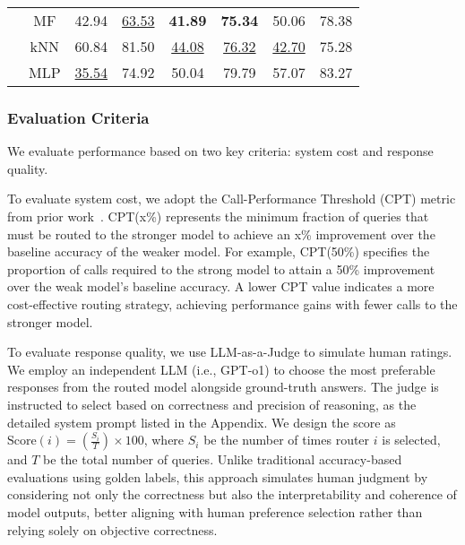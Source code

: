 \begin{table*}[t]
\begin{tabular*}{1.0\linewidth}{cccccccc}
        &
        MF &
        42.94 &
        \underline{63.53} &
        \textbf{41.89} &
        \textbf{75.34} &
        50.06 &
        78.38\\

        &
        kNN &
        60.84 &
        81.50 &
        \underline{44.08} &
        \underline{76.32} &
        \underline{42.70} &
        75.28\\

        
        &
        MLP &
        \underline{35.54}&
        74.92&
        50.04&
        79.79&
        57.07&
        83.27\\
        \bottomrule
    \end{tabular*}
\vspace{-1mm}
\label{table:baseline_results}
\end{table*}

\subsubsection{Evaluation Criteria}
We evaluate performance based on two key criteria: system cost and response quality.

To evaluate system cost, we adopt the Call-Performance Threshold (CPT) metric from prior work~\cite{Ong2024RouteLLMLT}. CPT(x\%) represents the minimum fraction of queries that must be routed to the stronger model to achieve an x\% improvement over the baseline accuracy of the weaker model. For example, CPT(50\%) specifies the proportion of calls required to the strong model to attain a 50\% improvement over the weak model’s baseline accuracy. A lower CPT value indicates a more cost-effective routing strategy, achieving performance gains with fewer calls to the stronger model.


To evaluate response quality, we use LLM-as-a-Judge to simulate human ratings. We employ an independent LLM (i.e., GPT-o1) to choose the most preferable responses from the routed model alongside ground-truth answers. The judge is instructed to select based on correctness and precision of reasoning, as the detailed system prompt listed in the Appendix. We design the score as $\text{Score}(i) = \left(\frac{S_i}{T}\right) \times 100$, where \( S_i \) be the number of times router \( i \) is selected, and \( T \) be the total number of queries. Unlike traditional accuracy-based evaluations using golden labels, this approach simulates human judgment by considering not only the correctness but also the interpretability and coherence of model outputs, better aligning with human preference selection rather than relying solely on objective correctness.


